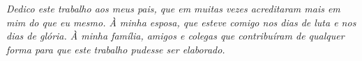 \documentclass[
	12pt,				%
	openright,			%
	twoside,			%
	a4paper,			%
	english,			%
	spanish,			%
	brazil,				%
	]{abntex2}
\newcommand\blankpage{%
    \null
    \thispagestyle{empty}%
    \addtocounter{page}{-1}%
    \newpage}
\begin{document}
% 





    
    

      
  




\begin{dedicatoria}
    \vspace*{\fill}
    \centering
    \noindent
    \textit{ Dedico este trabalho aos meus pais, que em muitas vezes acreditaram mais em mim do que eu mesmo. À minha esposa, que esteve comigo nos dias de luta e nos dias de glória. À minha família, amigos e colegas que contribuíram de qualquer forma para que este trabalho pudesse ser elaborado.} \vspace*{\fill}
\end{dedicatoria}
\afterpage{\blankpage}
\end{document}
